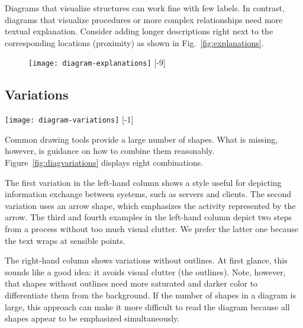Diagrams that visualize structures can work fine with few labels. In contrast, diagrams that visualize procedures or more complex relationships need more textual explanation. Consider adding longer descriptions right next to the corresponding locations (proximity) as shown in Fig.~\ref{fig:explanations}.

\begin{figure}[t]
\centering
\texttt{[image: diagram-explanations]} 
[-9\baselineskip]
\end{figure}


\subsection{Variations}

\begin{figure*}[t]
\centering
\texttt{[image: diagram-variations]}
[-1\baselineskip]
\end{figure*}

Common drawing tools provide a large number of shapes. What is missing, however, is guidance on how to combine them reasonably. Figure~\ref{fig:diagvariations} displays eight combinations.

The first variation in the left-hand column shows a style useful for depicting information exchange between systems, such as servers and clients. The second variation uses an arrow shape, which emphasizes the activity represented by the arrow. The third and fourth examples in the left-hand column depict two steps from a process without too much visual clutter. We prefer the latter one because the text wraps at sensible points.

The right-hand column shows variations without outlines. At first glance, this sounds like a good  idea: it avoids visual clutter (the outlines). Note, however, that shapes without outlines need more saturated and darker color to differentiate them from the background.  If the number of shapes in a diagram is large, this approach can make it more difficult to read the diagram because all shapes appear to be emphasized simultaneously.

